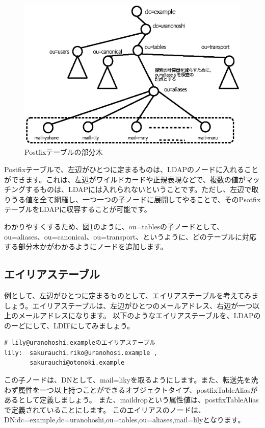 \begin{figure}[htbp]
	\includegraphics[width=12cm,clip]{draw/postfix_table.eps}
	\caption{Postfixテーブルの部分木}
	\label{fig:postfix_table}
\end{figure}

Postfixテーブルで、左辺がひとつに定まるものは、LDAPのノードに入れることができます。これは、左辺がワイルドカードや正規表現などで、複数の値がマッチングするものは、LDAPには入れられないということです。ただし、左辺で取りうる値を全て網羅し、一つ一つの子ノードに展開してやることで、そのPsotfixテーブルをLDAPに収容することが可能です。

わかりやすくするため、図\ref{fig:postfix_table}のように、ou=tablesの子ノードとして、ou=aliases、ou=canonical、ou=transport、というように、どのテーブルに対応する部分木かがわかるようにノードを追加します。


\subsection{エイリアステーブル}

例として、左辺がひとつに定まるものとして、エイリアステーブルを考えてみましょう。エイリアステーブルは、左辺がひとつのメールアドレス、右辺が一つ以上のメールアドレスになります。
以下のようなエイリアステーブルを、LDAPののーどにして、LDIFにしてみましょう。

\begin{verbatim}
# lily@uranohoshi.exampleのエイリアステーブル
lily:  sakurauchi.riko@uranohosi.example , 
       sakurauchi@otonoki.example
\end{verbatim}

この子ノードは、DNとして、mail=likyを取るようにします。また、転送先を洗わず属性を一つ以上持つことができるオブジェクトタイプ、postfixTableAliasがあるとして定義しましょう。
また、maildropという属性値は、postfixTableAliasで定義されていることにします。
このエイリアスのノードは、DN:dc=example,dc=uranohoshi,ou=tables,ou=aliases,mail=lilyとなります。

